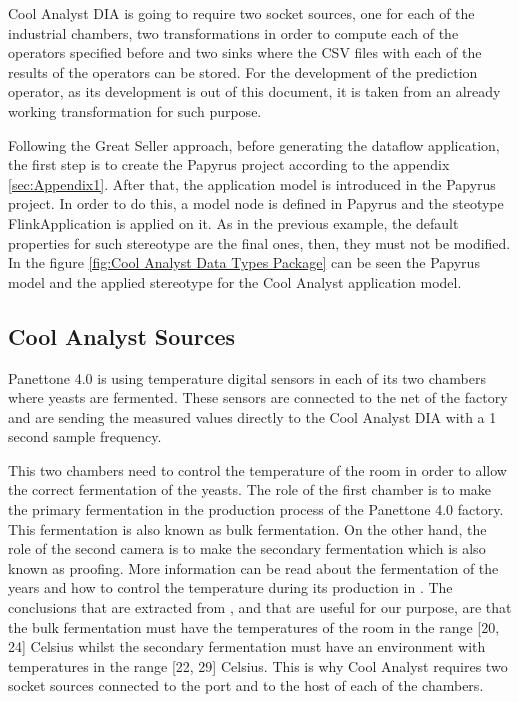 Cool Analyst DIA is going to require two socket sources, one for each of the industrial chambers, two transformations in order to compute each of the operators specified before and two sinks where the CSV files with each of the results of the operators can be stored. For the development of the prediction operator, as its development is out of this document, it is taken from an already working transformation for such purpose.

Following the Great Seller approach, before generating the dataflow application, the first step is to create the Papyrus project according to the appendix \ref{sec:Appendix1}. After that, the application model is introduced in the Papyrus project. In order to do this, a model node is defined in Papyrus and the steotype FlinkApplication is applied on it. As in the previous example, the default properties for such stereotype are the final ones, then, they must not be modified. In the figure \ref{fig:Cool Analyst Data Types Package} can be seen the Papyrus model and the applied stereotype for the Cool Analyst application model.

\subsection{Cool Analyst Sources}

Panettone 4.0 is using temperature digital sensors in each of its two chambers where yeasts are fermented. These sensors are connected to the net of the factory and are sending the measured values directly to the Cool Analyst DIA with a 1 second sample frequency.

This two chambers need to control the temperature of the room in order to allow the correct fermentation of the yeasts. The role of the first chamber is to make the primary fermentation in the production process of the Panettone 4.0 factory. This fermentation is also known as bulk fermentation. On the other hand, the role of the second camera is to make the secondary fermentation which is also known as proofing. More information can be read about the fermentation of the years and how to control the temperature during its production in \cite{yeastfermentation}. The conclusions that are extracted from \cite{yeastfermentation}, and that are useful for our purpose, are that the bulk fermentation must have the temperatures of the room in the range [20, 24] Celsius whilst the secondary fermentation must have an environment with temperatures in the range [22, 29] Celsius. This is why Cool Analyst requires two socket sources connected to the port and to the host of each of the chambers.

